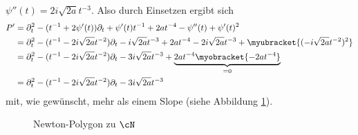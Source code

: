 $\psi''(t)=2i\sqrt{2a}t^{-3}$. Also durch Einsetzen ergibt sich
\begin{align*}
P' &= \partial_t^2 - (t^{-1} + 2\psi'(t))\partial_t
    + \psi'(t)t^{-1} + 2at^{-4} -\psi''(t)
    + \psi'(t)^2
\\&= \partial_t^2 - (t^{-1} - 2i\sqrt{2a}t^{-2})\partial_t - i\sqrt{2a}t^{-3}
    + 2at^{-4} - 2i\sqrt{2a}t^{-3} + \myubracket{(-i\sqrt{2a}t^{-2})^2}
\\&= \partial_t^2 - (t^{-1} - 2i\sqrt{2a}t^{-2})\partial_t - 3i\sqrt{2a}t^{-3}
  + \underset{=0}{\underbrace{ 2at^{-4} \myobracket{- 2at^{-4}}}}
\\&= \partial_t^2 - (t^{-1} - 2i\sqrt{2a}t^{-2})\partial_t - 3 i\sqrt{2a}t^{-3}
\end{align*}
mit, wie gewünscht, mehr als einem Slope (siehe Abbildung \ref{fig:afterTwist}).
\begin{figure}[H]
\begin{center}
\end{center}
\caption{Newton-Polygon zu $\cN$}
\label{fig:afterTwist}
\end{figure}
